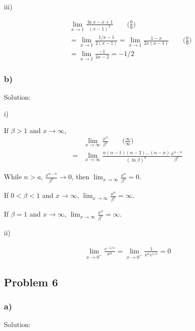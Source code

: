 \documentclass[letterpaper, 11pt]{article}
\newcommand{\1}{\mathds{1}}	%
\theoremstyle{definition}
\begin{document}
  iii)

  \begin{align*}
     & \lim_{x \to 1} \frac{\ln x - x + 1}{(x - 1)^{2}} \qquad\text{($\frac{0}{0}$)}                                 \\
     & = \lim_{x \to 1} \frac{1/x - 1}{2(x - 1)} = \lim_{x \to 1} \frac{1 - x}{2x(x-1)} \qquad\text{($\frac{0}{0}$)} \\
     & = \lim_{x \to 1} \frac{-1}{4x - 2} = -1/2
  \end{align*}

  \subsubsection*{b)}

  Solution:

  i)

  If $\beta > 1$ and $ x \to \infty$,
  \begin{align*}
      & \lim_{x \to \infty} \frac{x ^{\alpha}}{\beta ^{x}} \qquad\text{($\frac{\infty}{\infty}$)}                               \\
    = & \lim_{x \to \infty}\frac{\alpha(\alpha-1)(\alpha-2)\dots(\alpha-n)}{(\ln \beta)^{n}} \frac{x ^{\alpha - n}}{\beta ^{x}}
  \end{align*}

  While $n > a$, $\frac{x ^{\alpha - n}}{\beta ^{x}} \to 0$, then $\lim_{x \to \infty} \frac{x ^{\alpha}}{\beta ^{x}} = 0$.


  If $0 < \beta < 1$ and $ x \to \infty$, $\lim_{x \to \infty} \frac{x ^{\alpha}}{\beta ^{x}} = \infty$.


  If $\beta = 1$ and $x \to \infty $, $\lim_{x \to \infty} \frac{x ^{\alpha}}{\beta ^{x}} = \infty$.


  ii)

  \begin{align*}
    \lim_{x \to 0 ^{+}} \frac{e ^{-1/x}}{x ^{\alpha}} = \lim_{x \to 0 ^{+}} \frac{1}{x ^{\alpha}e ^{1/x}} = 0
  \end{align*}


  \subsection*{Problem 6}

  \subsubsection*{a)}

  Solution:
\end{document}
